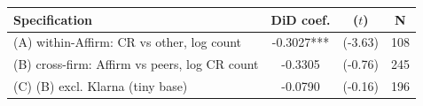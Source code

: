 \begin{tabular}{lccc}
\toprule
Specification & DiD coef. & ($t$) & N \\
\midrule
(A) within-Affirm: CR vs other, log count & -0.3027*** & (-3.63) & 108 \\
(B) cross-firm: Affirm vs peers, log CR count & -0.3305 & (-0.76) & 245 \\
(C) (B) excl. Klarna (tiny base) & -0.0790 & (-0.16) & 196 \\
\bottomrule
\end{tabular}